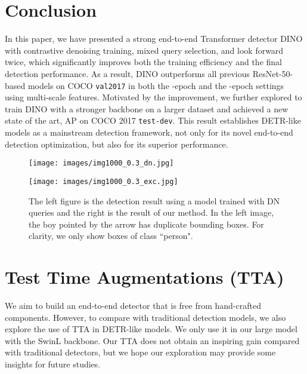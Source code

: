 \documentclass[runningheads]{llncs}
\begin{document}
\section{Conclusion}
In this paper, we have presented a strong end-to-end Transformer detector DINO with contrastive denoising training, mixed query selection, and look forward twice, which significantly improves both the training efficiency and the final detection performance. As a result, DINO outperforms all previous ResNet-50-based models on COCO \texttt{val2017} in both the -epoch and the -epoch settings using multi-scale features. Motivated by the improvement, we further explored to train DINO with a stronger backbone on a larger dataset and achieved a new state of the art,  AP on COCO 2017 \texttt{test-dev}. This result establishes DETR-like models as a mainstream detection framework, not only for its novel end-to-end detection optimization, but also for its superior performance.


\begin{figure}[h]
    \centering
    \begin{minipage}[t]{0.45\textwidth}
    \begin{center}
\texttt{[image: images/img1000\_0.3\_dn.jpg]}
\end{center}
\end{minipage}
\hfill
\vspace{-0.3cm}
\begin{minipage}[t]{0.45\textwidth}
\begin{center}
\texttt{[image: images/img1000\_0.3\_exc.jpg]}
\vspace{-0.2cm}
\end{center}
\end{minipage}

    \caption{The left figure is the detection result using a model trained with DN queries and the right is the result of our method. In the left image, the boy pointed by the arrow has  duplicate bounding boxes. For clarity, we only show boxes of class ``person".}
\label{fig:sample images}
    \vspace{-0.3cm}
\end{figure}
 \clearpage
{\small


}
\newpage
\appendix
\section{Test Time Augmentations (TTA)}
\label{section:tta}
We aim to build an end-to-end detector that is free from hand-crafted components. However, to compare with traditional detection models, we also explore the use of TTA in DETR-like models. We only use it in our large model with the SwinL backbone. Our TTA does not obtain an inspiring gain compared with traditional detectors, but we hope our exploration may provide some insights for future studies.
\end{document}
